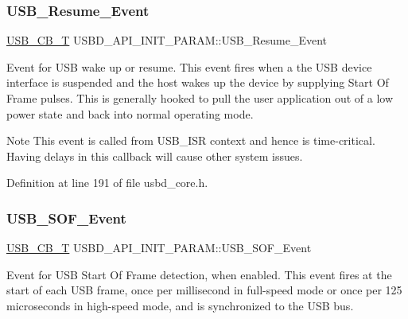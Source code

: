 \subsubsection{\texorpdfstring{U\+S\+B\+\_\+\+Resume\+\_\+\+Event}{USB\_Resume\_Event}}
{\footnotesize\ttfamily \hyperlink{group___u_s_b_d___core_ga0404ce046312aa5c798cc4a05c417e46}{U\+S\+B\+\_\+\+C\+B\+\_\+T} U\+S\+B\+D\+\_\+\+A\+P\+I\+\_\+\+I\+N\+I\+T\+\_\+\+P\+A\+R\+A\+M\+::\+U\+S\+B\+\_\+\+Resume\+\_\+\+Event}

Event for U\+SB wake up or resume. This event fires when a the U\+SB device interface is suspended and the host wakes up the device by supplying Start Of Frame pulses. This is generally hooked to pull the user application out of a low power state and back into normal operating mode. ~\newline
\begin{DoxyNote}{Note}
This event is called from U\+S\+B\+\_\+\+I\+SR context and hence is time-\/critical. Having delays in this callback will cause other system issues. 
\end{DoxyNote}


Definition at line 191 of file usbd\+\_\+core.\+h.

\mbox{\label{struct_u_s_b_d___a_p_i___i_n_i_t___p_a_r_a_m_af6f224a6b2ddee3c5b2056a62fa84914}} 
\subsubsection{\texorpdfstring{U\+S\+B\+\_\+\+S\+O\+F\+\_\+\+Event}{USB\_SOF\_Event}}
{\footnotesize\ttfamily \hyperlink{group___u_s_b_d___core_ga0404ce046312aa5c798cc4a05c417e46}{U\+S\+B\+\_\+\+C\+B\+\_\+T} U\+S\+B\+D\+\_\+\+A\+P\+I\+\_\+\+I\+N\+I\+T\+\_\+\+P\+A\+R\+A\+M\+::\+U\+S\+B\+\_\+\+S\+O\+F\+\_\+\+Event}

Event for U\+SB Start Of Frame detection, when enabled. This event fires at the start of each U\+SB frame, once per millisecond in full-\/speed mode or once per 125 microseconds in high-\/speed mode, and is synchronized to the U\+SB bus.

